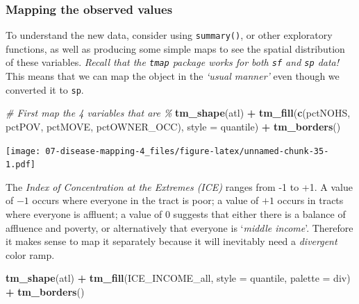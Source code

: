 \documentclass[
]{book}
\newenvironment{Shaded}{\begin{snugshade}}{\end{snugshade}}
\newcommand{\AttributeTok}[1]{\textcolor[rgb]{0.13,0.29,0.53}{#1}}
\newcommand{\CommentTok}[1]{\textcolor[rgb]{0.56,0.35,0.01}{\textit{#1}}}
\newcommand{\FunctionTok}[1]{\textcolor[rgb]{0.13,0.29,0.53}{\textbf{#1}}}
\newcommand{\NormalTok}[1]{#1}
\newcommand{\SpecialCharTok}[1]{\textcolor[rgb]{0.81,0.36,0.00}{\textbf{#1}}}
\newcommand{\StringTok}[1]{\textcolor[rgb]{0.31,0.60,0.02}{#1}}
\begin{document}
\hypertarget{mapping-the-observed-values}{%
\subsubsection{Mapping the observed values}\label{mapping-the-observed-values}}

To understand the new data, consider using \texttt{summary()}, or other exploratory functions, as well as producing some simple maps to see the spatial distribution of these variables. \emph{Recall that the \texttt{tmap} package works for both \texttt{sf} and \texttt{sp} data!} This means that we can map the object in the \emph{`usual manner'} even though we converted it to \texttt{sp}.

\begin{Shaded}
\begin{Highlighting}[]
\CommentTok{\# First map the 4 variables that are \%}
\FunctionTok{tm\_shape}\NormalTok{(atl) }\SpecialCharTok{+} 
  \FunctionTok{tm\_fill}\NormalTok{(}\FunctionTok{c}\NormalTok{(}\StringTok{\textquotesingle{}pctNOHS\textquotesingle{}}\NormalTok{, }\StringTok{\textquotesingle{}pctPOV\textquotesingle{}}\NormalTok{, }\StringTok{\textquotesingle{}pctMOVE\textquotesingle{}}\NormalTok{, }\StringTok{\textquotesingle{}pctOWNER\_OCC\textquotesingle{}}\NormalTok{),}
          \AttributeTok{style =} \StringTok{\textquotesingle{}quantile\textquotesingle{}}\NormalTok{) }\SpecialCharTok{+}
  \FunctionTok{tm\_borders}\NormalTok{()}
\end{Highlighting}
\end{Shaded}

\texttt{[image: 07-disease-mapping-4\_files/figure-latex/unnamed-chunk-35-1.pdf]}

The \emph{Index of Concentration at the Extremes (ICE)} ranges from -1 to +1. A value of \(-1\) occurs where everyone in the tract is poor; a value of \(+1\) occurs in tracts where everyone is affluent; a value of \(0\) suggests that either there is a balance of affluence and poverty, or alternatively that everyone is `\emph{middle income}'. Therefore it makes sense to map it separately because it will inevitably need a \emph{divergent} color ramp.

\begin{Shaded}
\begin{Highlighting}[]
\FunctionTok{tm\_shape}\NormalTok{(atl) }\SpecialCharTok{+}
  \FunctionTok{tm\_fill}\NormalTok{(}\StringTok{\textquotesingle{}ICE\_INCOME\_all\textquotesingle{}}\NormalTok{,}
          \AttributeTok{style =} \StringTok{\textquotesingle{}quantile\textquotesingle{}}\NormalTok{,}
          \AttributeTok{palette =} \StringTok{\textquotesingle{}div\textquotesingle{}}\NormalTok{) }\SpecialCharTok{+}
  \FunctionTok{tm\_borders}\NormalTok{()}
\end{Highlighting}
\end{Shaded}
\end{document}
